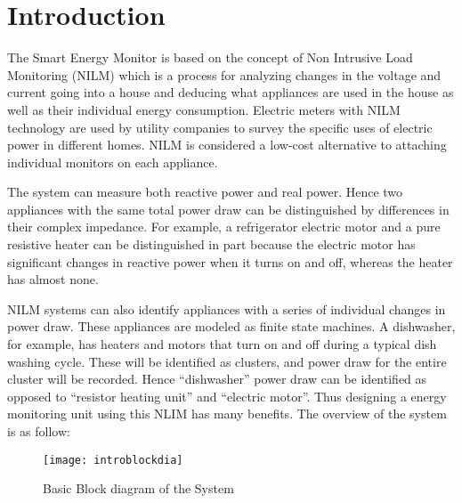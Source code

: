 \chapter{Introduction}
{
The Smart Energy Monitor is based on the concept of Non Intrusive Load Monitoring (NILM) which is a process for analyzing changes in the voltage and current going into a house and deducing what appliances are used in the house as well as their individual energy consumption. Electric meters with NILM technology are used by utility companies to survey the specific uses of electric power in different homes. NILM is considered a low-cost alternative to attaching individual monitors on each appliance. 

The system can measure both reactive power and real power. Hence two appliances with the same total power draw can be distinguished by differences in their complex impedance. For example, a refrigerator electric motor and a pure resistive heater can be distinguished in part because the electric motor has significant changes in reactive power when it turns on and off, whereas the heater has almost none.

NILM systems can also identify appliances with a series of individual changes in power draw. These appliances are modeled as finite state machines. A dishwasher, for example, has heaters and motors that turn on and off during a typical dish washing cycle. These will be identified as clusters, and power draw for the entire cluster will be recorded. Hence ``dishwasher'' power draw can be identified as opposed to ``resistor heating unit'' and ``electric motor''.
Thus designing a energy monitoring unit using this NLIM has many benefits. The overview of the system is as follow:
\begin{figure}[H]
	\texttt{[image: introblockdia]} %
	\caption{Basic Block diagram of the System}
	\label{blck}
\end{figure}
}



